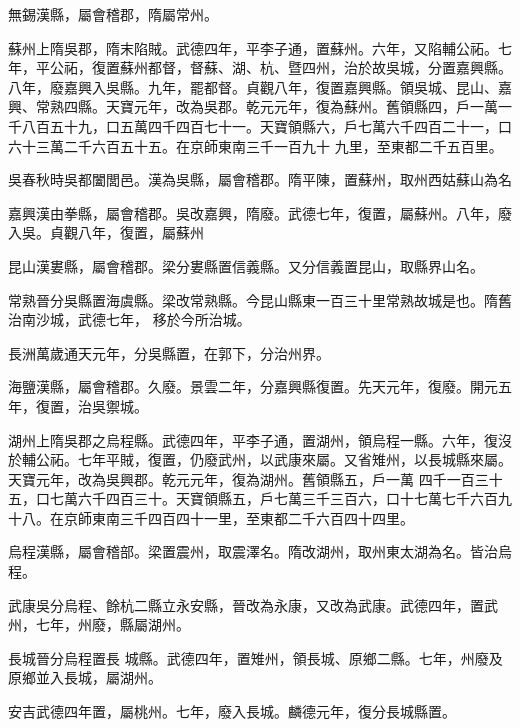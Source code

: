 \begin{pinyinscope}
 無錫漢縣，屬會稽郡，隋屬常州。



 蘇州上隋吳郡，隋末陷賊。武德四年，平李子通，置蘇州。六年，又陷輔公祏。七年，平公祏，復置蘇州都督，督蘇、湖、杭、暨四州，治於故吳城，分置嘉興縣。八年，廢嘉興入吳縣。九年，罷都督。貞觀八年，復置嘉興縣。領吳城、昆山、嘉興、常熟四縣。天寶元年，改為吳郡。乾元元年，復為蘇州。舊領縣四，戶一萬一千八百五十九，口五萬四千四百七十一。天寶領縣六，戶七萬六千四百二十一，口六十三萬二千六百五十五。在京師東南三千一百九十
 九里，至東都二千五百里。



 吳春秋時吳都闔閭邑。漢為吳縣，屬會稽郡。隋平陳，置蘇州，取州西姑蘇山為名



 嘉興漢由拳縣，屬會稽郡。吳改嘉興，隋廢。武德七年，復置，屬蘇州。八年，廢入吳。貞觀八年，復置，屬蘇州



 昆山漢婁縣，屬會稽郡。梁分婁縣置信義縣。又分信義置昆山，取縣界山名。



 常熟晉分吳縣置海虞縣。梁改常熟縣。今昆山縣東一百三十里常熟故城是也。隋舊治南沙城，武德七年，
 移於今所治城。



 長洲萬歲通天元年，分吳縣置，在郭下，分治州界。



 海鹽漢縣，屬會稽郡。久廢。景雲二年，分嘉興縣復置。先天元年，復廢。開元五年，復置，治吳禦城。



 湖州上隋吳郡之烏程縣。武德四年，平李子通，置湖州，領烏程一縣。六年，復沒於輔公祏。七年平賊，復置，仍廢武州，以武康來屬。又省雉州，以長城縣來屬。天寶元年，改為吳興郡。乾元元年，復為湖州。舊領縣五，戶一萬
 四千一百三十五，口七萬六千四百三十。天寶領縣五，戶七萬三千三百六，口十七萬七千六百九十八。在京師東南三千四百四十一里，至東都二千六百四十四里。



 烏程漢縣，屬會稽部。梁置震州，取震澤名。隋改湖州，取州東太湖為名。皆治烏程。



 武康吳分烏程、餘杭二縣立永安縣，晉改為永康，又改為武康。武德四年，置武州，七年，州廢，縣屬湖州。



 長城晉分烏程置長
 城縣。武德四年，置雉州，領長城、原鄉二縣。七年，州廢及原鄉並入長城，屬湖州。



 安吉武德四年置，屬桃州。七年，廢入長城。麟德元年，復分長城縣置。




\end{pinyinscope}

